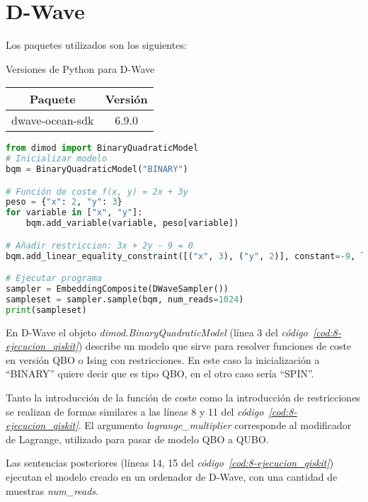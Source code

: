 \section{D-Wave}

Los paquetes utilizados son los siguientes:

\begin{table}{}{Versiones de Python para D-Wave}
  \centering
  \begin{tabular}{|c|c|}
    \hline
    \textbf{Paquete} & \textbf{Versión} \\ \hline
    dwave-ocean-sdk  & 6.9.0            \\
    \hline
  \end{tabular}
\end{table}

\begin{lstlisting}[language=Python,label=cod:8-ejecucion_qiskit,caption={Ejemplo de ejecución en D-Wave},style=numbered]
from dimod import BinaryQuadraticModel
# Inicializar modelo
bqm = BinaryQuadraticModel("BINARY")

# Función de coste f(x, y) = 2x + 3y
peso = {"x": 2, "y": 3}
for variable in ["x", "y"]:
    bqm.add_variable(variable, peso[variable])

# Añadir restriccion: 3x + 2y - 9 = 0
bqm.add_linear_equality_constraint([("x", 3), ("y", 2)], constant=-9, lagrange_multiplier=P)

# Ejecutar programa
sampler = EmbeddingComposite(DWaveSampler())
sampleset = sampler.sample(bqm, num_reads=1024)
print(sampleset)
\end{lstlisting}

En D-Wave el objeto \textit{dimod.BinaryQuadraticModel} (línea 3 del \textit{código~\ref{cod:8-ejecucion_qiskit}}) describe un modelo que sirve para resolver funciones de coste en versión QBO o Ising con restricciones.
En este caso la inicialización a ``BINARY'' quiere decir que es tipo QBO, en el otro caso sería ``SPIN''.

Tanto la introducción de la función de coste como la introducción de restricciones se realizan de formas similares a las líneas 8 y 11 del \textit{código~\ref{cod:8-ejecucion_qiskit}}.
El argumento \textit{lagrange\_multiplier} corresponde al modificador de Lagrange, utilizado para pasar de modelo QBO a QUBO\@.

Las sentencias posteriores (líneas 14, 15 del \textit{código~\ref{cod:8-ejecucion_qiskit}}) ejecutan el modelo creado en un ordenador de D-Wave, con una cantidad de muestras \textit{num\_reads}.


